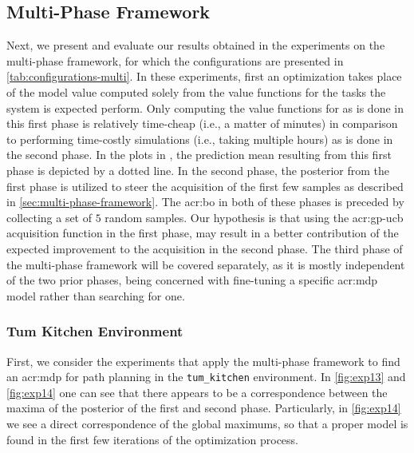 \newpage

\subsection{Multi-Phase Framework}
\label{sec:multiphase-framework-results}

Next, we present and evaluate our results obtained in the experiments on the multi-phase framework, for which the configurations are presented in \autoref{tab:configurations-multi}.
In these experiments, first an optimization takes place of the model value computed solely from the value functions for the tasks the system is expected perform.
Only computing the value functions for  as is done in this first phase is relatively time-cheap (i.e., a matter of minutes) in comparison to performing time-costly simulations (i.e., taking multiple hours) as is done in the second phase.
In the plots in , the prediction mean resulting from this first phase is depicted by a dotted line.
In the second phase, the posterior from the first phase is utilized to steer the acquisition of the first few samples as described in \autoref{sec:multi-phase-framework}.
The \acrshort{acr:bo} in both of these phases is preceded by collecting a set of $5$ random samples.
Our hypothesis is that using the \acrshort{acr:gp-ucb} acquisition function in the first phase, may result in a better contribution of the expected improvement to the acquisition in the second phase.
The third phase of the multi-phase framework will be covered separately, as it is mostly independent of the two prior phases, being concerned with fine-tuning a specific \acrshort{acr:mdp} model rather than searching for one.

\subsubsection{Tum Kitchen Environment}
First, we consider the experiments that apply the multi-phase framework to find an \acrshort{acr:mdp} for path planning in the \texttt{tum\_kitchen} environment.
In \autoref{fig:exp13} and \autoref{fig:exp14} one can see that there appears to be a correspondence between the maxima of the posterior of the first and second phase.
Particularly, in \autoref{fig:exp14} we see a direct correspondence of the global maximums, so that a proper model is found in the first few iterations of the optimization process.

